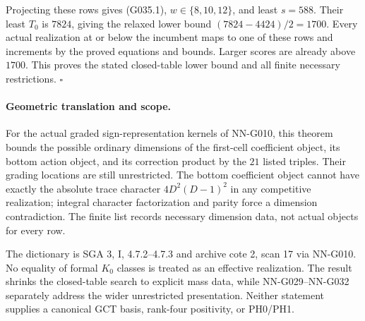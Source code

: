 Projecting these rows gives (G035.1), $w\in\{8,10,12\}$,
and least $s=588$. Their least $T_0$ is $7824$, giving
the relaxed lower bound $(7824-4424)/2=1700$.
Every actual realization at or below the incumbent
maps to one of these rows and increments by the
proved equations and bounds. Larger scores are already
above $1700$. This proves the stated closed-table
lower bound and all finite necessary restrictions.
\hfill$\square$

\paragraph{Geometric translation and scope.}
For the actual graded sign-representation kernels of
NN-G010, this theorem bounds the possible ordinary
dimensions of the first-cell coefficient object, its
bottom action object, and its correction product by
the $21$ listed triples. Their grading locations are
still unrestricted. The bottom coefficient object
cannot have exactly the absolute trace character
$4D^2(D-1)^2$ in any competitive realization; integral
character factorization and parity force a dimension
contradiction. The finite list records necessary
dimension data, not actual objects for every row.

The dictionary is SGA 3, I, 4.7.2--4.7.3 and archive
cote 2, scan 17 via NN-G010. No equality of formal
$K_0$ classes is treated as an effective realization.
The result shrinks the closed-table search to explicit
mass data, while NN-G029--NN-G032 separately address
the wider unrestricted presentation. Neither statement
supplies a canonical GCT basis, rank-four positivity,
or PH0/PH1.

